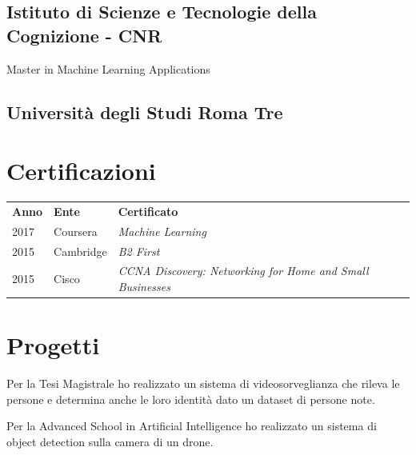 \documentclass[]{deedy-resume-openfont}
\begin{document}
\begin{minipage}[t]{0.66\textwidth}
\subsection{Istituto di Scienze e Tecnologie della Cognizione - CNR}
Master in Machine Learning Applications \\
\sectionsep

\subsection{Università degli Studi Roma Tre}
\sectionsep


\section{Certificazioni}
\begin{tabular}{@{}lll@{}}
\textbf{Anno} & \textbf{Ente} & \textbf{Certificato} \\
2017          & Coursera      & \textit{Machine Learning} \\
2015	      & Cambridge     & \textit{B2 First} \\
2015	      & Cisco         & \textit{CCNA Discovery: Networking for Home and Small Businesses} \\
\end{tabular}
\sectionsep


\section{Progetti}

Per la Tesi Magistrale ho realizzato un sistema di videosorveglianza che rileva le persone e determina anche le loro identità dato un dataset di persone note.

Per la Advanced School in Artificial Intelligence ho realizzato un sistema di object detection sulla camera di un drone.


\end{minipage}
\end{document}
